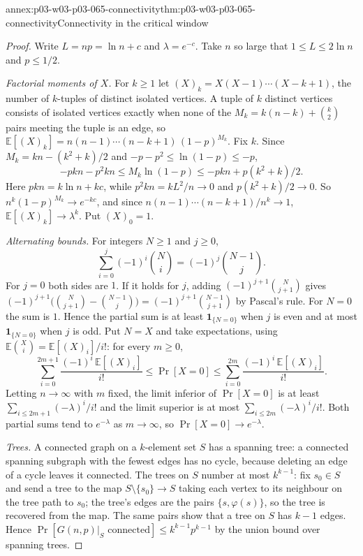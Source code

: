 \begin{annexitem}{annex:p03-w03-p03-065-connectivity}{thm:p03-w03-p03-065-connectivity}{Connectivity in the critical window}
\begin{proof}
Write \(L=np=\ln n+c\) and \(\lambda=e^{-c}\).  Take \(n\) so large that
\(1\leq L\leq2\ln n\) and \(p\leq1/2\).

\emph{Factorial moments of \(X\).}  For \(k\geq1\) let \((X)_k=X(X-1)\cdots
(X-k+1)\), the number of \(k\)-tuples of distinct isolated vertices.  A tuple
of \(k\) distinct vertices consists of isolated vertices exactly when none of
the \(M_k=k(n-k)+\binom k2\) pairs meeting the tuple is an edge, so
\(\mathbb E[(X)_k]=n(n-1)\cdots(n-k+1)\,(1-p)^{M_k}\).  Fix \(k\).  Since
\(M_k=kn-(k^2+k)/2\) and \(-p-p^2\leq\ln(1-p)\leq-p\),
\[
  -pkn-p^2kn\leq M_k\ln(1-p)\leq-pkn+p(k^2+k)/2 .
\]
Here \(pkn=k\ln n+kc\), while \(p^2kn=kL^2/n\to0\) and
\(p(k^2+k)/2\to0\).  So \(n^k(1-p)^{M_k}\to e^{-kc}\), and since
\(n(n-1)\cdots(n-k+1)/n^k\to1\), \(\mathbb E[(X)_k]\to\lambda^k\).  Put
\((X)_0=1\).

\emph{Alternating bounds.}  For integers \(N\geq1\) and \(j\geq0\),
\[
  \sum_{i=0}^{j}(-1)^i\binom Ni=(-1)^j\binom{N-1}j .
\]
For \(j=0\) both sides are \(1\).  If it holds for \(j\), adding
\((-1)^{j+1}\binom N{j+1}\) gives
\((-1)^{j+1}\bigl(\binom N{j+1}-\binom{N-1}j\bigr)=(-1)^{j+1}\binom{N-1}{j+1}\)
by Pascal's rule.  For \(N=0\) the sum is \(1\).  Hence the partial sum is at
least \(\mathbf 1_{\{N=0\}}\) when \(j\) is even and at most
\(\mathbf 1_{\{N=0\}}\) when \(j\) is odd.  Put \(N=X\) and take
expectations, using \(\mathbb E\binom Xi=\mathbb E[(X)_i]/i!\): for every
\(m\geq0\),
\[
  \sum_{i=0}^{2m+1}\frac{(-1)^i\,\mathbb E[(X)_i]}{i!}\leq\Pr[X=0]
  \leq\sum_{i=0}^{2m}\frac{(-1)^i\,\mathbb E[(X)_i]}{i!}.
\]
Letting \(n\to\infty\) with \(m\) fixed, the limit inferior of \(\Pr[X=0]\)
is at least \(\sum_{i\leq2m+1}(-\lambda)^i/i!\) and the limit superior is at
most \(\sum_{i\leq2m}(-\lambda)^i/i!\).  Both partial sums tend to
\(e^{-\lambda}\) as \(m\to\infty\), so \(\Pr[X=0]\to e^{-\lambda}\).

\emph{Trees.}  A connected graph on a \(k\)-element set \(S\) has a spanning
tree: a connected spanning subgraph with the fewest edges has no cycle,
because deleting an edge of a cycle leaves it connected.  The trees on \(S\)
number at most \(k^{k-1}\): fix \(s_0\in S\) and send a tree to the map
\(S\setminus\{s_0\}\to S\) taking each vertex to its neighbour on the tree
path to \(s_0\); the tree's edges are the pairs \(\{s,\varphi(s)\}\), so the
tree is recovered from the map.  The same pairs show that a tree on \(S\) has
\(k-1\) edges.  Hence \(\Pr[G(n,p)|_S\text{ connected}]\leq k^{k-1}p^{k-1}\)
by the union bound over spanning trees.


\end{proof}
\end{annexitem}
